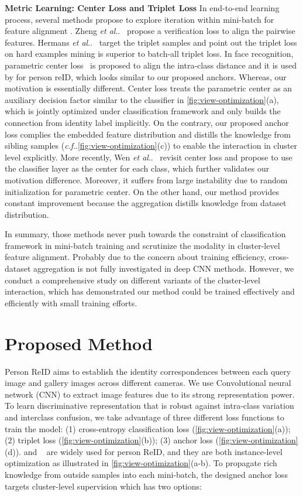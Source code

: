\documentclass[runningheads]{llncs}
\makeatletter
\DeclareRobustCommand\onedot{\futurelet\@let@token\@onedot}
\def\@onedot{\ifx\@let@token.\else.\null\fi\xspace}
\def\cf{\emph{c.f}\onedot} \def\Cf{\emph{C.f}\onedot}
\def\etal{\emph{et al}\onedot}
\makeatother
\begin{document}
\noindent \textbf{Metric Learning: Center Loss and Triplet Loss}
In end-to-end learning process, several methods propose to explore iteration within mini-batch for feature alignment .
Zheng \etal~\cite{zheng-verificationloss} propose a verification loss to align the pairwise features.
Hermans \etal~\cite{hermans-triplethard} target the triplet samples and point out the triplet loss on hard examples mining is superior to batch-all triplet loss.
In face recognition, parametric center loss~\cite{wen-centerloss} is proposed to align the intra-class distance and it is used by \cite{luo-bnneck} for person reID, which looks similar to our proposed anchors.
Whereas, our motivation is essentially different.
Center loss treats the parametric center as an auxiliary decision factor similar to the classifier  in \cref{fig:view-optimization}(a), which is jointly optimized under classification framework and only builds the connection from identity label implicitly.
On the contrary, our proposed anchor loss complies the embedded feature distribution and distills the knowledge from sibling samples (\cf \cref{fig:view-optimization}(c)) to enable the interaction in cluster level explicitly.
More recently, Wen \etal~\cite{wen2019comprehensive} revisit center loss and propose to use the classifier layer as the center for each class, which further validates our motivation difference.
Moreover, it suffers from large instability due to random initialization for parametric center.
On the other hand, our method provides constant improvement because the aggregation distills knowledge from dataset distribution.


In summary, those methods never push towards the constraint of classification framework in mini-batch training and scrutinize the modality in cluster-level feature alignment.
Probably due to the concern about training efficiency, cross-dataset aggregation is not fully investigated in deep CNN methods.
However, we conduct a comprehensive study on different variants of the cluster-level interaction, which has demonstrated our method could be trained effectively and efficiently with small training efforts.


\section{Proposed Method}

Person ReID aims to establish the identity correspondences between each query image and gallery images across different cameras. We use Convolutional neural network (CNN) to extract image features due to its strong representation power.  To learn discriminative representation that is  robust against intra-class variation and interclass confusion, we take advantage of three different loss functions to train the model: (1) cross-entropy classification loss  (\cref{fig:view-optimization}(a)); (2) triplet loss  (\cref{fig:view-optimization}(b)); (3) anchor loss  (\cref{fig:view-optimization}(d)).
 and ~\cite{hermans-triplethard} are widely used for person ReID, and they are both instance-level optimization as illustrated in \cref{fig:view-optimization}(a-b).  To  propagate rich knowledge from outside samples into each mini-batch, the designed anchor loss  targets cluster-level supervision which has two options:
\end{document}
